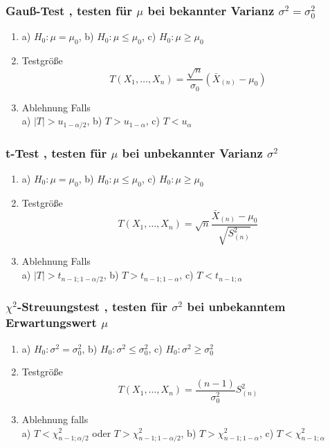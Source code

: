 \documentclass[
ngerman,
accentcolor=9c,%
type=intern,
marginpar=false
]{tudapub}
\begin{document}
        \subsubsection*{Gauß-Test , testen für $\mu$ bei bekannter Varianz $\sigma^2 = \sigma_0^2$}
            \begin{enumerate}
                \item a) $H_0: \mu = \mu_0$, b) $H_0: \mu \leq \mu_0$, c) $H_0: \mu \geq \mu_0$
                \item Testgröße
                \begin{equation*}
                    T(X_1,\dots,X_n)=\dfrac{\sqrt{n}}{\sigma_0}(\bar{X}_{(n)}-\mu_0)
                \end{equation*}
                \item Ablehnung Falls\\
                a) $|T| > u_{1-\alpha/2}$, b) $T > u_{1-\alpha}$, c) $T < u_{\alpha}$
            \end{enumerate}
        \subsubsection*{t-Test , testen für $\mu$ bei unbekannter Varianz $\sigma^2$}
            \begin{enumerate}
                \item a) $H_0: \mu = \mu_0$, b) $H_0: \mu \leq \mu_0$, c) $H_0: \mu \geq \mu_0$
                \item Testgröße
                \begin{equation*}
                    T(X_1,\dots,X_n)=\sqrt{n}\dfrac{\bar{X}_{(n)}-\mu_0}{\sqrt{S_{(n)}^2}}
                \end{equation*}
                \item Ablehnung Falls\\
                a) $|T| > t_{n-1;1-\alpha/2}$, b) $T > t_{n-1;1-\alpha}$, c) $T < t_{n-1;\alpha}$
            \end{enumerate}
        \subsubsection*{$\chi^2$-Streuungstest , testen für $\sigma^2$ bei unbekanntem Erwartungswert $\mu$}
            \begin{enumerate}
                \item a) $H_0: \sigma^2 = \sigma^2_0$, b) $H_0: \sigma^2 \leq \sigma^2_0$, c) $H_0: \sigma^2 \geq \sigma^2_0$
                \item Testgröße
                \begin{equation*}
                    T(X_1,\dots,X_n)=\dfrac{(n-1)}{\sigma^2_0}S^2_{(n)}
                \end{equation*}
                \item Ablehnung falls\\
                a) $T<\chi^2_{n-1;\alpha/2}$ oder $T>\chi^2_{n-1;1-\alpha/2}$,
                b) $T>\chi^2_{n-1;1-\alpha}$,
                c) $T<\chi^2_{n-1;\alpha}$
            \end{enumerate}
\end{document}
